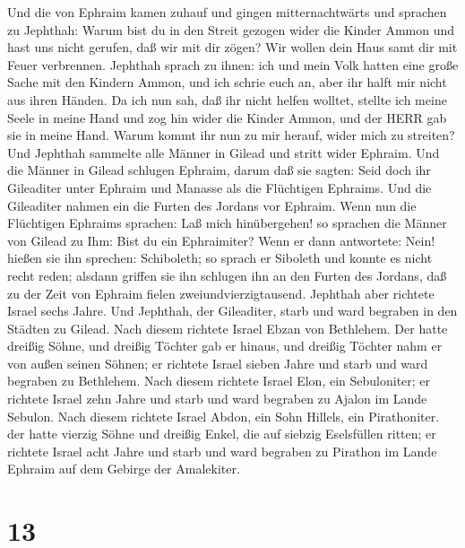  Und die von Ephraim kamen zuhauf und gingen
mitternachtwärts und sprachen zu Jephthah: Warum bist du in den Streit
gezogen wider die Kinder Ammon und hast uns nicht gerufen, daß wir mit
dir zögen? Wir wollen dein Haus samt dir mit Feuer verbrennen.
 Jephthah sprach zu ihnen: ich und mein Volk hatten eine
große Sache mit den Kindern Ammon, und ich schrie euch an, aber ihr
halft mir nicht aus ihren Händen.  Da ich nun sah, daß ihr
nicht helfen wolltet, stellte ich meine Seele in meine Hand und zog hin
wider die Kinder Ammon, und der HERR gab sie in meine Hand. Warum kommt
ihr nun zu mir herauf, wider mich zu streiten?  Und Jephthah
sammelte alle Männer in Gilead und stritt wider Ephraim. Und die Männer
in Gilead schlugen Ephraim, darum daß sie sagten: Seid doch ihr
Gileaditer unter Ephraim und Manasse als die Flüchtigen Ephraims.
 Und die Gileaditer nahmen ein die Furten des Jordans vor
Ephraim. Wenn nun die Flüchtigen Ephraims sprachen: Laß mich
hinübergehen! so sprachen die Männer von Gilead zu Ihm: Bist du ein
Ephraimiter? Wenn er dann antwortete: Nein!  hießen sie ihn
sprechen: Schiboleth; so sprach er Siboleth und konnte es nicht recht
reden; alsdann griffen sie ihn schlugen ihn an den Furten des Jordans,
daß zu der Zeit von Ephraim fielen zweiundvierzigtausend. 
Jephthah aber richtete Israel sechs Jahre. Und Jephthah, der Gileaditer,
starb und ward begraben in den Städten zu Gilead.  Nach
diesem richtete Israel Ebzan von Bethlehem.  Der hatte
dreißig Söhne, und dreißig Töchter gab er hinaus, und dreißig Töchter
nahm er von außen seinen Söhnen; er richtete Israel sieben Jahre
 und starb und ward begraben zu Bethlehem. 
Nach diesem richtete Israel Elon, ein Sebuloniter; er richtete Israel
zehn Jahre  und starb und ward begraben zu Ajalon im Lande
Sebulon.  Nach diesem richtete Israel Abdon, ein Sohn
Hillels, ein Pirathoniter.  der hatte vierzig Söhne und
dreißig Enkel, die auf siebzig Eselsfüllen ritten; er richtete Israel
acht Jahre  und starb und ward begraben zu Pirathon im
Lande Ephraim auf dem Gebirge der Amalekiter.

\hypertarget{section-12}{%
\section{13}\label{section-12}}

